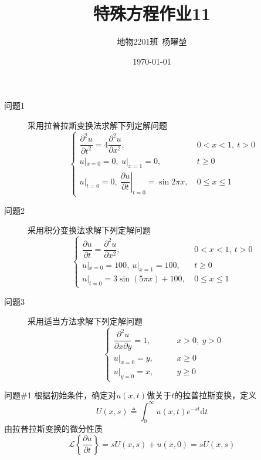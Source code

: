 \documentclass[12pt]{ctexart}
\title{特殊方程作业11}
\author{地物2201班\ 杨曜堃}
\date{\today}
\begin{document}
    \markboth{\theauthor}{\thetitle}
    \maketitle
    \begin{description}
        \item[问题1] 采用拉普拉斯变换法求解下列定解问题$$
        \begin{cases}
            \dfrac{\partial^2u}{\partial t^2}=4\dfrac{\partial^2u}{\partial x^2},&\ 0<x<1,\ t>0\\
            u|_{x=0}=0,\ u|_{x=1}=0,&\ t\geqslant0\\
            u|_{t=0}=0,\ \left.\dfrac{\partial u}{\partial t}\right|_{t=0}=\sin2\pi x,&\ 0\leqslant x\leqslant1
        \end{cases}
        $$
        \item[问题2] 采用积分变换法求解下列定解问题$$
        \begin{cases}
            \dfrac{\partial u}{\partial t}=\dfrac{\partial^2u}{\partial x^2},&\ 0<x<1,\ t>0\\
            u|_{x=0}=100,\ u|_{x=1}=100,&\ t\geqslant0\\
            u|_{t=0}=3\sin(5\pi x)+100,&\ 0\leqslant x\leqslant1
        \end{cases}
        $$
        \item[问题3] 采用适当方法求解下列定解问题$$
        \begin{cases}
            \dfrac{\partial^2u}{\partial x\partial y}=1,&\qquad x>0,\ y>0\\
            u|_{x=0}=y,&\qquad x\geqslant 0\\
            u|_{y=0}=x,&\qquad y\geqslant 0
        \end{cases}
        $$
    \end{description}
    \begin{problem}{问题\#1}
        根据初始条件，确定对$u(x,t)$做关于$t$的拉普拉斯变换，定义
        $$
        U(x,s)\triangleq\int^{\infty}_0u(x,t)e^{-st}\mathrm{d}t
        $$
        由拉普拉斯变换的微分性质
        $$
        \mathscr{L}\left\{\dfrac{\partial u}{\partial t}\right\}=sU(x,s)+u(x,0)=sU(x,s)
        $$
    \end{problem}
\end{document}
